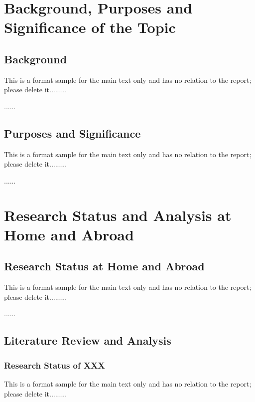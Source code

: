 
\section{Background, Purposes and Significance of the Topic}

\subsection{Background}

This is a format sample for the main text only and has no relation to the report; please delete it.........

......

\subsection{Purposes and Significance}

This is a format sample for the main text only and has no relation to the report; please delete it.........

......

\section{Research Status and Analysis at Home and Abroad}

\subsection{Research Status at Home and Abroad}

This is a format sample for the main text only and has no relation to the report; please delete it.........

......

\subsection{Literature Review and Analysis}

\subsubsection{Research Status of XXX}

This is a format sample for the main text only and has no relation to the report; please delete it.........

